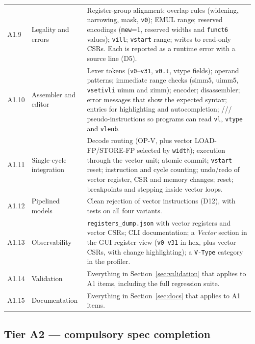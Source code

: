 \documentclass[11pt]{article}
\begin{document}
\begin{longtable}{@{}L{1.0cm}L{3.4cm}L{10.7cm}@{}}
A1.9 & Legality and errors & Register-group alignment; overlap rules (widening, narrowing, mask, \texttt{v0}); EMUL range; reserved encodings (\texttt{mew}=1, reserved widths and \texttt{funct6} values); \texttt{vill}; \texttt{vstart} range; writes to read-only CSRs. Each is reported as a runtime error with a source line (D5). \\
A1.10 & Assembler and editor & Lexer tokens (\texttt{v0}--\texttt{v31}, \texttt{v0.t}, vtype fields); operand patterns; immediate range checks (simm5, uimm5, \texttt{vsetivli} uimm and zimm); encoder; disassembler; error messages that show the expected syntax;  entries for highlighting and autocompletion; /// pseudo-instructions so programs can read \texttt{vl}, \texttt{vtype} and \texttt{vlenb}. \\
A1.11 & Single-cycle integration & Decode routing (OP-V, plus vector LOAD-FP/STORE-FP selected by \texttt{width}); execution through the vector unit; atomic commit; \texttt{vstart} reset; instruction and cycle counting; undo/redo of vector register, CSR and memory changes; reset; breakpoints and stepping inside vector loops. \\
A1.12 & Pipelined models & Clean rejection of vector instructions (D12), with tests on all four variants. \\
A1.13 & Observability & \texttt{registers\_dump.json} with vector registers and vector CSRs; CLI documentation; a \emph{Vector} section in the GUI register view (\texttt{v0}--\texttt{v31} in hex, plus vector CSRs, with change highlighting); a \texttt{V-Type} category in the profiler. \\
A1.14 & Validation & Everything in Section~\ref{sec:validation} that applies to A1 items, including the full regression suite. \\
A1.15 & Documentation & Everything in Section~\ref{sec:docs} that applies to A1 items. \\
\bottomrule
\end{longtable}
\normalsize

\subsection{Tier A2 --- compulsory spec completion}
\end{document}
